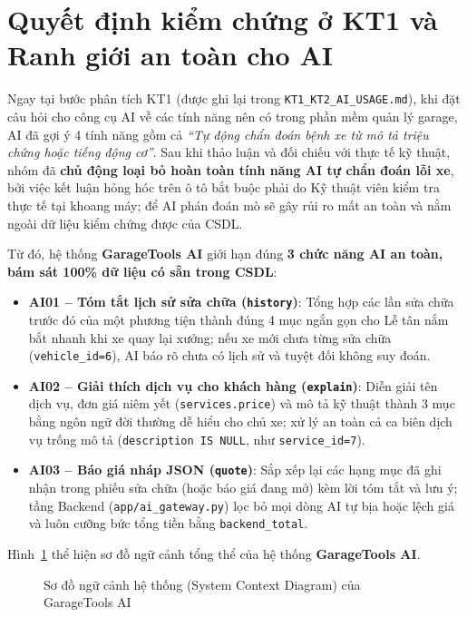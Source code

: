 \section{Quyết định kiểm chứng ở KT1 và Ranh giới an toàn cho AI}

Ngay tại bước phân tích KT1 (được ghi lại trong \texttt{KT1\_KT2\_AI\_USAGE.md}), khi đặt câu hỏi cho công cụ AI về các tính năng nên có trong phần mềm quản lý garage, AI đã gợi ý 4 tính năng gồm cả \textit{“Tự động chẩn đoán bệnh xe từ mô tả triệu chứng hoặc tiếng động cơ”}. Sau khi thảo luận và đối chiếu với thực tế kỹ thuật, nhóm đã \textbf{chủ động loại bỏ hoàn toàn tính năng AI tự chẩn đoán lỗi xe}, bởi việc kết luận hỏng hóc trên ô tô bắt buộc phải do Kỹ thuật viên kiểm tra thực tế tại khoang máy; để AI phán đoán mò sẽ gây rủi ro mất an toàn và nằm ngoài dữ liệu kiểm chứng được của CSDL.

Từ đó, hệ thống \textbf{GarageTools AI} giới hạn đúng \textbf{3 chức năng AI an toàn, bám sát 100\% dữ liệu có sẵn trong CSDL}:
\begin{itemize}[noitemsep,topsep=2pt]
  \item \textbf{AI01 -- Tóm tắt lịch sử sửa chữa (\texttt{history})}: Tổng hợp các lần sửa chữa trước đó của một phương tiện thành đúng 4 mục ngắn gọn cho Lễ tân nắm bắt nhanh khi xe quay lại xưởng; nếu xe mới chưa từng sửa chữa (\texttt{vehicle\_id=6}), AI báo rõ chưa có lịch sử và tuyệt đối không suy đoán.
  \item \textbf{AI02 -- Giải thích dịch vụ cho khách hàng (\texttt{explain})}: Diễn giải tên dịch vụ, đơn giá niêm yết (\texttt{services.price}) và mô tả kỹ thuật thành 3 mục bằng ngôn ngữ đời thường dễ hiểu cho chủ xe; xử lý an toàn cả ca biên dịch vụ trống mô tả (\texttt{description IS NULL}, như \texttt{service\_id=7}).
  \item \textbf{AI03 -- Báo giá nháp JSON (\texttt{quote})}: Sắp xếp lại các hạng mục đã ghi nhận trong phiếu sửa chữa (hoặc báo giá đang mở) kèm lời tóm tắt và lưu ý; tầng Backend (\texttt{app/ai\_gateway.py}) lọc bỏ mọi dòng AI tự bịa hoặc lệch giá và luôn cưỡng bức tổng tiền bằng \texttt{backend\_total}.
\end{itemize}

Hình~\ref{fig:g-context} thể hiện sơ đồ ngữ cảnh tổng thể của hệ thống \textbf{GarageTools AI}.

\begin{figure}[H]
\centering
\vspace{2pt}

\vspace{2pt}
\caption{Sơ đồ ngữ cảnh hệ thống (System Context Diagram) của GarageTools AI}
\label{fig:g-context}
\end{figure}

